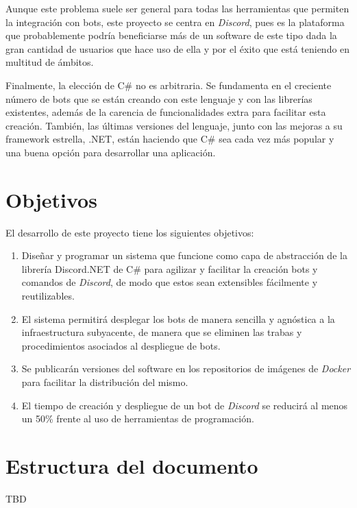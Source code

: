 Aunque este problema suele ser general para todas las herramientas que permiten la integración con bots, este proyecto se centra en \textit{Discord}, pues es la plataforma que probablemente podría beneficiarse más de un software de este tipo dada la gran cantidad de usuarios que hace uso de ella y por el éxito\cite{enlyft} que está teniendo en multitud de ámbitos.

Finalmente, la elección de C\# no es arbitraria. Se fundamenta en el creciente número de bots que se están creando con este lenguaje y con las librerías existentes, además de la carencia de funcionalidades extra para facilitar esta creación. También, las últimas versiones del lenguaje, junto con las mejoras a su framework estrella, .NET, están haciendo que C\# sea cada vez más popular y una buena opción para desarrollar una aplicación.

\section{Objetivos}

El desarrollo de este proyecto tiene los siguientes objetivos:

\begin{enumerate}
	\item Diseñar y programar un sistema que funcione como capa de abstracción de la librería Discord.NET de C\# para agilizar y facilitar la creación bots y comandos de \textit{Discord}, de modo que estos sean extensibles fácilmente y reutilizables.
	\item El sistema permitirá desplegar los bots de manera sencilla y agnóstica a la infraestructura subyacente, de manera que se eliminen las trabas y procedimientos asociados al despliegue de bots. 
	\item Se publicarán versiones del software en los repositorios de imágenes de \textit{Docker} para facilitar la distribución del mismo.
	\item El tiempo de creación y despliegue de un bot de \textit{Discord} se reducirá al menos un 50\% frente al uso de herramientas de programación.
\end{enumerate}

\section{Estructura del documento}

TBD
